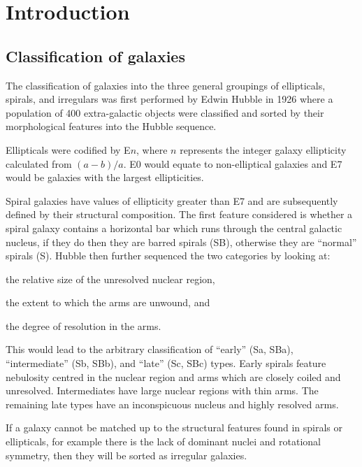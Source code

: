 \documentclass[12pt, twocolumn]{revtex4}    %
\begin{document}

\null\newpage
\null\newpage
\tableofcontents

\section{Introduction} 
\subsection{Classification of galaxies}
\noindent
The classification of galaxies into the three general groupings of ellipticals, spirals, and irregulars was first performed by Edwin Hubble in 1926 \citep{1926ApJ....64..321H} where a population of 400 extra-galactic objects were classified and sorted by their morphological features into the Hubble sequence.

Ellipticals were codified by E$n$, where $n$ represents the integer galaxy ellipticity calculated from $(a-b)/a$. E0 would equate to non-elliptical galaxies and E7 would be galaxies with the largest ellipticities. 

Spiral galaxies have values of ellipticity greater than E7 and are subsequently defined by their structural composition. The first feature considered is whether a spiral galaxy contains a horizontal bar which runs through the central galactic nucleus, if they do then they are barred spirals (SB), otherwise they are ``normal'' spirals (S). Hubble then further sequenced the two categories by looking at: 
\begin {enumerate*} [label=\itshape\alph*\upshape)]
\item the relative size of the unresolved nuclear region, \item the extent to which the arms are unwound, and \item the degree of resolution in the arms. 
\end {enumerate*} 
This would lead to the arbitrary classification of ``early'' (Sa, SBa), ``intermediate'' (Sb, SBb), and ``late'' (Sc, SBc) types. Early spirals feature nebulosity centred in the nuclear region and arms which are closely coiled and unresolved. Intermediates have large nuclear regions with thin arms. The remaining late types have an inconspicuous nucleus and highly resolved arms.  

If a galaxy cannot be matched up to the structural features found in spirals or ellipticals, for example there is the lack of dominant nuclei and rotational symmetry, then they will be sorted as irregular galaxies.
\end{document}
